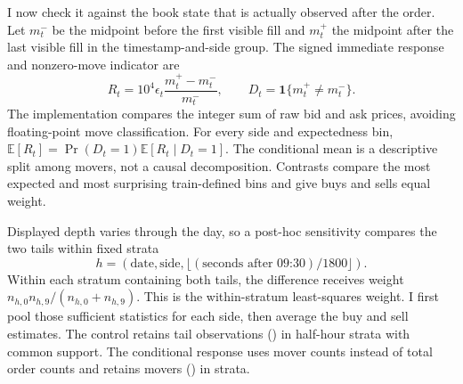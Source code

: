 \documentclass[11pt,a4paper]{article}
\begin{document}
I now check it against the book state that is actually observed after the
order. Let $m_t^-$ be the midpoint before the first visible fill and $m_t^+$ the
midpoint after the last visible fill in the timestamp-and-side group. The signed
immediate response and nonzero-move indicator are
\begin{equation}
  R_t=10^4\epsilon_t\frac{m_t^+-m_t^-}{m_t^-},
  \qquad D_t=\mathbf{1}\{m_t^+\ne m_t^-\}.
\end{equation}
The implementation compares the integer sum of raw bid and ask prices, avoiding
floating-point move classification. For every side and expectedness bin,
$\mathbb{E}[R_t]=\Pr(D_t=1)\mathbb{E}[R_t\mid D_t=1]$. The conditional mean is a
descriptive split among movers, not a causal decomposition. Contrasts compare
the most expected and most surprising train-defined bins and give buys and
sells equal weight.

Displayed depth varies through the day, so a post-hoc sensitivity compares the
two tails within fixed strata
\begin{equation}
  h=(\text{date},\text{side},
  \lfloor(\text{seconds after 09:30})/1800\rfloor).
\end{equation}
Within each stratum containing both tails, the difference receives weight
$n_{h,0}n_{h,9}/(n_{h,0}+n_{h,9})$. This is the within-stratum least-squares
weight. I first pool those sufficient statistics for each side, then average
the buy and sell estimates. The control retains \IntradayTailCoverage{}
tail observations (\IntradayTailCoveragePct{}) in
\IntradayStrataCoverage{} half-hour strata with common support. The conditional
response uses mover counts instead of total order counts and retains
\ConditionalTailCoverage{} movers (\ConditionalTailCoveragePct{}) in
\ConditionalStrataCoverage{} strata.
\end{document}

